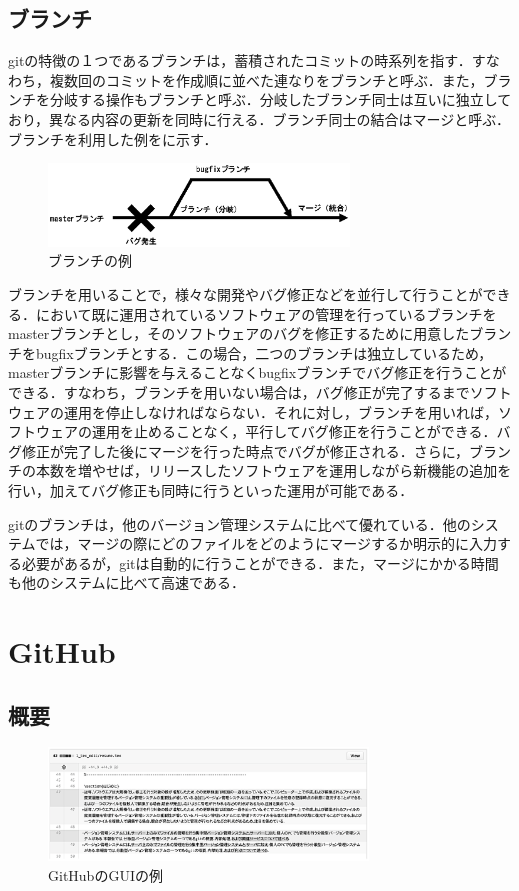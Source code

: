 \documentclass[a4j,9pt,twocolumn]{jsarticle}
\begin{document}
\subsection{ブランチ}
gitの特徴の１つであるブランチは，蓄積されたコミットの時系列を指す．すなわち，複数回のコミットを作成順に並べた連なりをブランチと呼ぶ．また，ブランチを分岐する操作もブランチと呼ぶ．分岐したブランチ同士は互いに独立しており，異なる内容の更新を同時に行える．ブランチ同士の結合はマージと呼ぶ．ブランチを利用した例をに示す．

\begin{figure}[h]
\centering
\includegraphics[width=80mm]{img/branch.eps}
\caption{ブランチの例}
\label{branch_ex}
\end{figure}

ブランチを用いることで，様々な開発やバグ修正などを並行して行うことができる．において既に運用されているソフトウェアの管理を行っているブランチをmasterブランチとし，そのソフトウェアのバグを修正するために用意したブランチをbugfixブランチとする．この場合，二つのブランチは独立しているため，masterブランチに影響を与えることなくbugfixブランチでバグ修正を行うことができる．すなわち，ブランチを用いない場合は，バグ修正が完了するまでソフトウェアの運用を停止しなければならない．それに対し，ブランチを用いれば，ソフトウェアの運用を止めることなく，平行してバグ修正を行うことができる．バグ修正が完了した後にマージを行った時点でバグが修正される．さらに，ブランチの本数を増やせば，リリースしたソフトウェアを運用しながら新機能の追加を行い，加えてバグ修正も同時に行うといった運用が可能である．

gitのブランチは，他のバージョン管理システムに比べて優れている．他のシステムでは，マージの際にどのファイルをどのようにマージするか明示的に入力する必要があるが，gitは自動的に行うことができる．また，マージにかかる時間も他のシステムに比べて高速である．

\section{GitHub}
\subsection{概要}

\begin{figure}[h]
\centering
\includegraphics[width=85mm]{img/github.eps}
\caption{GitHubのGUIの例}
\label{branch_ex}
\end{figure}
\end{document}
